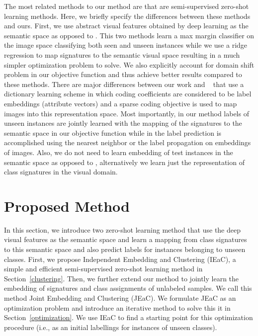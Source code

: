 \documentclass[letterpaper]{article}
\begin{document}
The most related methods to our method are  \cite{li15max,Kodirov2015,semi15}
 that are semi-supervised zero-shot learning methods.
Here, we briefly specify the differences between these methods and ours.
 First, we use abstract visual features obtained by deep learning as the semantic space as opposed to  \cite{li15max,semi15}.
 This two methods learn a max margin classifier on the image space classifying both seen and unseen
instances while we use a ridge regression to map signatures to the semantic visual space resulting
 in a much simpler optimization problem to solve.
 We also explicitly account for domain shift problem in our objective function and thus achieve better results compared to these methods.
%
There are major differences between our work and ~\cite{Kodirov2015} that use a dictionary learning scheme
in which coding coefficients are considered to be label embeddings (attribute vectors) and a sparse coding objective is used to map images into this representation space.
Most importantly, in our method labels of unseen instances are jointly learned
with the mapping of the signatures to the semantic space in our objective function while in \cite{Kodirov2015}
the label prediction is accomplished using the nearest neighbor or the label propagation on embeddings of images.
Also, we do not need to learn embedding of test instances in the semantic space as opposed to \cite{Kodirov2015},
alternatively we learn just the representation of class signatures in the visual domain.

\section{Proposed Method} \label{proposed}
In this section, we introduce two zero-shot learning method that use the deep visual features as the semantic space and learn
a mapping from class signatures to this semantic space and also predict labels for instances belonging to unseen classes.
 First, we propose Independent Embedding and Clustering (IEaC), a simple and efficient semi-supervised zero-shot learning method in Section~\ref{clustering}.
Then, we further extend our method to jointly learn the embedding of signatures and class assignments of unlabeled samples.
We call this method Joint Embedding and Clustering (JEaC). We formulate JEaC as an optimization problem and
 introduce an iterative method to solve this it in Section~\ref{optimization}.
 We use IEaC to find a starting point for this optimization procedure (i.e., as an initial labellings for instances of unseen classes).
\end{document}

